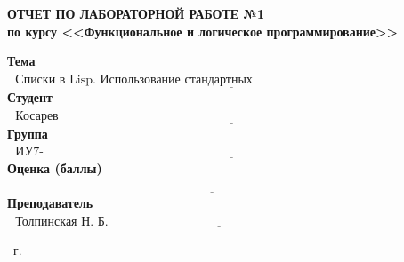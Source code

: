 \begin{titlepage}
	
	\begin{center}
		\Large\textbf{ОТЧЕТ ПО ЛАБОРАТОРНОЙ РАБОТЕ №1}\\
		\large\textbf{по курсу <<Функциональное и логическое программирование>>}\\
	\end{center}\vspace{2cm}

	
	\noindent\textbf{Тема} $\underline{\text{~~Списки в Lisp. Использование стандартных функций.~~~~~~~~~~~~~~~~~~~~~~~~~~~~~~~~~~~~~~~~~~~}}$\newline\newline
	\noindent\textbf{Студент} $\underline{\text{~~Косарев А.А.~~~~~~~~~~~~~~~~~~~~~~~~~~~~~~~~~~~~~~~~~~~~~~~~~~~~~~~~~~~~~~~~~~~~~~~~~~~~~~~~~~~~~~~~~}}$\newline\newline
	\noindent\textbf{Группа} $\underline{\text{~~ИУ7-61Б~~~~~~~~~~~~~~~~~~~~~~~~~~~~~~~~~~~~~~~~~~~~~~~~~~~~~~~~~~~~~~~~~~~~~~~~~~~~~~~~~~~~~~~~~~~~~~~~~}}$\newline\newline
	\noindent\textbf{Оценка (баллы)} $\underline{\text{~~~~~~~~~~~~~~~~~~~~~~~~~~~~~~~~~~~~~~~~~~~~~~~~~~~~~~~~~~~~~~~~~~~~~~~~~~~~~~~~~~~~~~~~~~~~~~~~~~~}}$\newline\newline
	\noindent\textbf{Преподаватель} $\underline{\text{~~Толпинская Н. Б.~~~~~~~~~~~~~~~~~~~~~~~~~~~~~~~~~~~~~~~~~~~~~~~~~~~~~~~~~~~~~~~~~~~~~~~~~~~~~~}}$\newline
	
	\begin{center}
		\vfill
		\the\year
		~г.
	\end{center}
\end{titlepage}
